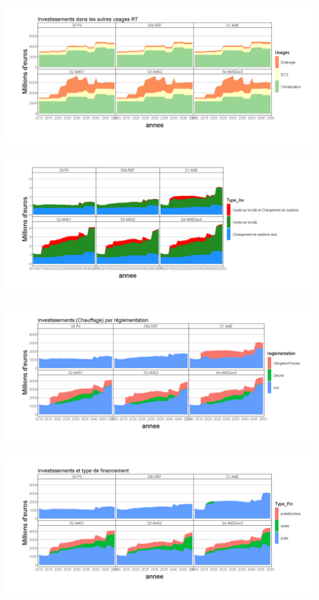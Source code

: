 \documentclass[]{article}
\begin{document}
\includegraphics{Exemple_sortiestertiaire_files/figure-latex/INV_Autres-1.png}

\includegraphics{Exemple_sortiestertiaire_files/figure-latex/INV_Type-1.png}

\includegraphics{Exemple_sortiestertiaire_files/figure-latex/INV_Renov_reglementation-1.png}

\includegraphics{Exemple_sortiestertiaire_files/figure-latex/INV_aides-1.png}
\end{document}
